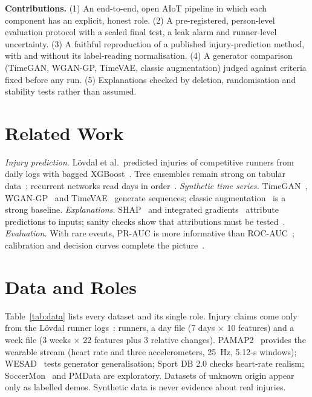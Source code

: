 \documentclass[conference]{IEEEtran}
\begin{document}
\textbf{Contributions.} (1) An end-to-end, open AIoT pipeline in which each component has an
explicit, honest role. (2) A pre-registered, person-level evaluation protocol with a sealed
final test, a leak alarm and runner-level uncertainty. (3) A faithful reproduction of a
published injury-prediction method, with and without its label-reading normalisation.
(4) A generator comparison (TimeGAN, WGAN-GP, TimeVAE, classic augmentation) judged against
criteria fixed before any run. (5) Explanations checked by deletion, randomisation and stability
tests rather than assumed.

\section{Related Work}
\textit{Injury prediction.} L\"ovdal et al.\ predicted injuries of competitive runners from
daily logs with bagged XGBoost~\cite{lovdal2021,chen2016}. Tree ensembles remain strong on
tabular data~\cite{grinsztajn2022,breiman2001,prokhorenkova2018}; recurrent networks read days
in order~\cite{cho2014}. \textit{Synthetic time series.} TimeGAN~\cite{yoon2019},
WGAN-GP~\cite{gulrajani2017} and TimeVAE~\cite{desai2021} generate sequences; classic
augmentation~\cite{um2017} is a strong baseline. \textit{Explanations.} SHAP~\cite{lundberg2017}
and integrated gradients~\cite{sundararajan2017} attribute predictions to inputs; sanity checks
show that attributions must be tested~\cite{adebayo2018}. \textit{Evaluation.} With rare events,
PR-AUC is more informative than ROC-AUC~\cite{saito2015,davis2006}; calibration and decision
curves complete the picture~\cite{vancalster2019,vickers2006}.

\section{Data and Roles}
Table~\ref{tab:data} lists every dataset and its single role. Injury claims come only from the
L\"ovdal runner logs~\cite{lovdal2021data}: \lovdalRunners{} runners, a day file (7 days
$\times$ 10 features) and a week file (3 weeks $\times$ 22 features plus 3 relative changes).
PAMAP2~\cite{reiss2012} provides the wearable stream (heart rate and three accelerometers, 25~Hz,
5.12-s windows); WESAD~\cite{schmidt2018} tests generator generalisation; Sport DB 2.0 checks
heart-rate realism; SoccerMon~\cite{midoglu2024} and PMData are exploratory. Datasets of unknown
origin appear only as labelled demos. Synthetic data is never evidence about real injuries.

\end{document}

